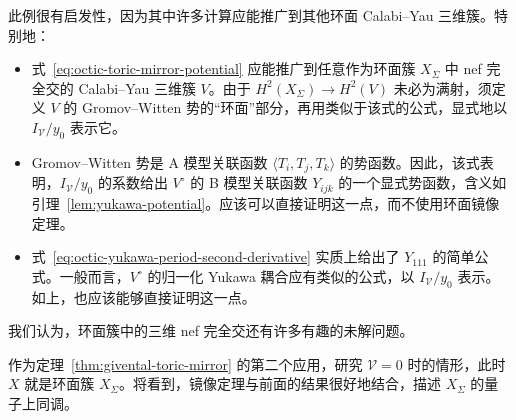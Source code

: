 \begin{example}
此例很有启发性，因为其中许多计算应能推广到其他环面 Calabi--Yau 三维簇。特别地：
\begin{itemize}
\item 式~\eqref{eq:octic-toric-mirror-potential} 应能推广到任意作为环面簇 $X_\Sigma$ 中 nef 完全交的 Calabi--Yau 三维簇 $V$。由于 $H^2(X_\Sigma)\to H^2(V)$ 未必为满射，须定义 $V$ 的 Gromov--Witten 势的“环面”部分，再用类似于该式的公式，显式地以 $I_{\mathcal V}/y_0$ 表示它。
\item Gromov--Witten 势是 A 模型关联函数 $\langle T_i,T_j,T_k\rangle$ 的势函数。因此，该式表明，$I_{\mathcal V}/y_0$ 的系数给出 $V^\circ$ 的 B 模型关联函数 $Y_{ijk}$ 的一个显式势函数，含义如引理~\ref{lem:yukawa-potential}。应该可以直接证明这一点，而不使用环面镜像定理。
\item 式~\eqref{eq:octic-yukawa-period-second-derivative} 实质上给出了 $Y_{111}$ 的简单公式。一般而言，$V^\circ$ 的归一化 Yukawa 耦合应有类似的公式，以 $I_{\mathcal V}/y_0$ 表示。如上，也应该能够直接证明这一点。
\end{itemize}
我们认为，环面簇中的三维 nef 完全交还有许多有趣的未解问题。
\end{example}
作为定理~\ref{thm:givental-toric-mirror} 的第二个应用，研究 $\mathcal V=0$ 时的情形，此时 $X$ 就是环面簇 $X_\Sigma$。将看到，镜像定理与前面的结果很好地结合，描述 $X_\Sigma$ 的量子上同调。
